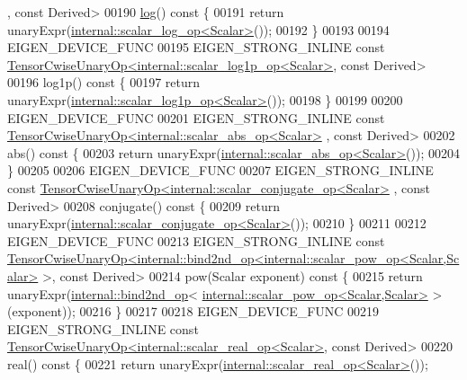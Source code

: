 \begin{DoxyCode}
      , \textcolor{keyword}{const} Derived>
00190     \hyperlink{structlog}{log}()\textcolor{keyword}{ const }\{
00191       \textcolor{keywordflow}{return} unaryExpr(\hyperlink{struct_eigen_1_1internal_1_1scalar__log__op}{internal::scalar\_log\_op<Scalar>}());
00192     \}
00193 
00194     EIGEN\_DEVICE\_FUNC
00195     EIGEN\_STRONG\_INLINE \textcolor{keyword}{const} 
      \hyperlink{class_eigen_1_1_tensor_cwise_unary_op}{TensorCwiseUnaryOp<internal::scalar\_log1p\_op<Scalar>}, \textcolor{keyword}{
      const} Derived>
00196     log1p()\textcolor{keyword}{ const }\{
00197       \textcolor{keywordflow}{return} unaryExpr(\hyperlink{struct_eigen_1_1internal_1_1scalar__log1p__op}{internal::scalar\_log1p\_op<Scalar>}());
00198     \}
00199 
00200     EIGEN\_DEVICE\_FUNC
00201     EIGEN\_STRONG\_INLINE \textcolor{keyword}{const} \hyperlink{class_eigen_1_1_tensor_cwise_unary_op}{TensorCwiseUnaryOp<internal::scalar\_abs\_op<Scalar>}
      , \textcolor{keyword}{const} Derived>
00202     abs()\textcolor{keyword}{ const }\{
00203       \textcolor{keywordflow}{return} unaryExpr(\hyperlink{struct_eigen_1_1internal_1_1scalar__abs__op}{internal::scalar\_abs\_op<Scalar>}());
00204     \}
00205 
00206     EIGEN\_DEVICE\_FUNC
00207     EIGEN\_STRONG\_INLINE \textcolor{keyword}{const} 
      \hyperlink{class_eigen_1_1_tensor_cwise_unary_op}{TensorCwiseUnaryOp<internal::scalar\_conjugate\_op<Scalar>}
      , \textcolor{keyword}{const} Derived>
00208     conjugate()\textcolor{keyword}{ const }\{
00209       \textcolor{keywordflow}{return} unaryExpr(\hyperlink{struct_eigen_1_1internal_1_1scalar__conjugate__op}{internal::scalar\_conjugate\_op<Scalar>}());
00210     \}
00211 
00212     EIGEN\_DEVICE\_FUNC
00213     EIGEN\_STRONG\_INLINE \textcolor{keyword}{const} 
      \hyperlink{class_eigen_1_1_tensor_cwise_unary_op}{TensorCwiseUnaryOp<internal::bind2nd\_op<internal::scalar\_pow\_op<Scalar,Scalar>}
       >, \textcolor{keyword}{const} Derived>
00214     pow(Scalar exponent)\textcolor{keyword}{ const }\{
00215       \textcolor{keywordflow}{return} unaryExpr(\hyperlink{struct_eigen_1_1internal_1_1bind2nd__op}{internal::bind2nd\_op}<
      \hyperlink{struct_eigen_1_1internal_1_1scalar__pow__op}{internal::scalar\_pow\_op<Scalar,Scalar>} >(exponent));
00216     \}
00217 
00218     EIGEN\_DEVICE\_FUNC
00219     EIGEN\_STRONG\_INLINE \textcolor{keyword}{const} 
      \hyperlink{class_eigen_1_1_tensor_cwise_unary_op}{TensorCwiseUnaryOp<internal::scalar\_real\_op<Scalar>}, \textcolor{keyword}{
      const} Derived>
00220     real()\textcolor{keyword}{ const }\{
00221       \textcolor{keywordflow}{return} unaryExpr(\hyperlink{struct_eigen_1_1internal_1_1scalar__real__op}{internal::scalar\_real\_op<Scalar>}());

\end{DoxyCode}
